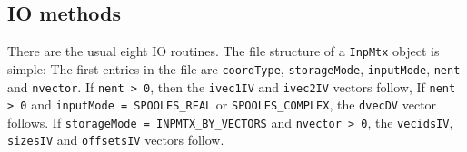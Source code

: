 \subsection{IO methods}
\label{subsection:InpMtx:proto:IO}
\par
There are the usual eight IO routines.
The file structure of a {\tt InpMtx} object is simple:
The first entries in the file are
{\tt coordType},
{\tt storageMode},
{\tt inputMode},
{\tt nent} and
{\tt nvector}.
If {\tt nent > 0}, then the
{\tt ivec1IV} and {\tt ivec2IV} vectors follow,
If {\tt nent > 0} and {\tt inputMode = SPOOLES\_REAL}
or {\tt SPOOLES\_COMPLEX}, 
the {\tt dvecDV} vector follows.
If {\tt storageMode = INPMTX\_BY\_VECTORS} and {\tt nvector > 0}, 
the {\tt vecidsIV}, {\tt sizesIV} and {\tt offsetsIV} vectors follow.
\par

